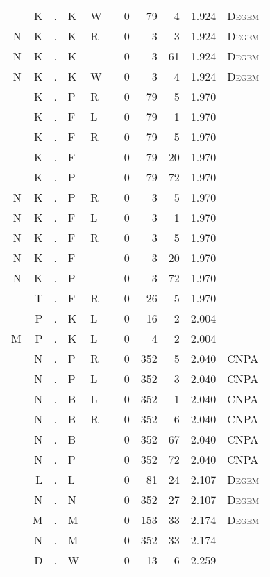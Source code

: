 \begin{longtable}{r@{ } r@{ } c@{ } l@{ } l@{ } l@{ } r r r r l }
  & K & . & K & W &   & 0 & 79 & 4 & 1.924 & \textsc{Degem} \\
N & K & . & K & R &   & 0 & 3 & 3 & 1.924 & \textsc{Degem} \\
N & K & . & K &   &   & 0 & 3 & 61 & 1.924 & \textsc{Degem} \\
N & K & . & K & W &   & 0 & 3 & 4 & 1.924 & \textsc{Degem} \\
  & K & . & P & R &   & 0 & 79 & 5 & 1.970 &  \\
  & K & . & F & L &   & 0 & 79 & 1 & 1.970 &  \\
  & K & . & F & R &   & 0 & 79 & 5 & 1.970 &  \\
  & K & . & F &   &   & 0 & 79 & 20 & 1.970 &  \\
  & K & . & P &   &   & 0 & 79 & 72 & 1.970 &  \\
N & K & . & P & R &   & 0 & 3 & 5 & 1.970 &  \\
N & K & . & F & L &   & 0 & 3 & 1 & 1.970 &  \\
N & K & . & F & R &   & 0 & 3 & 5 & 1.970 &  \\
N & K & . & F &   &   & 0 & 3 & 20 & 1.970 &  \\
N & K & . & P &   &   & 0 & 3 & 72 & 1.970 &  \\
  & T & . & F & R &   & 0 & 26 & 5 & 1.970 &  \\
  & P & . & K & L &   & 0 & 16 & 2 & 2.004 &  \\
M & P & . & K & L &   & 0 & 4 & 2 & 2.004 &  \\
  & N & . & P & R &   & 0 & 352 & 5 & 2.040 & \textsc{CNPA} \\
  & N & . & P & L &   & 0 & 352 & 3 & 2.040 & \textsc{CNPA} \\
  & N & . & B & L &   & 0 & 352 & 1 & 2.040 & \textsc{CNPA} \\
  & N & . & B & R &   & 0 & 352 & 6 & 2.040 & \textsc{CNPA} \\
  & N & . & B &   &   & 0 & 352 & 67 & 2.040 & \textsc{CNPA} \\
  & N & . & P &   &   & 0 & 352 & 72 & 2.040 & \textsc{CNPA} \\
  & L & . & L &   &   & 0 & 81 & 24 & 2.107 & \textsc{Degem} \\
  & N & . & N &   &   & 0 & 352 & 27 & 2.107 & \textsc{Degem} \\
  & M & . & M &   &   & 0 & 153 & 33 & 2.174 & \textsc{Degem} \\
  & N & . & M &   &   & 0 & 352 & 33 & 2.174 &  \\
  & D & . & W &   &   & 0 & 13 & 6 & 2.259 &  \\

\end{longtable}
